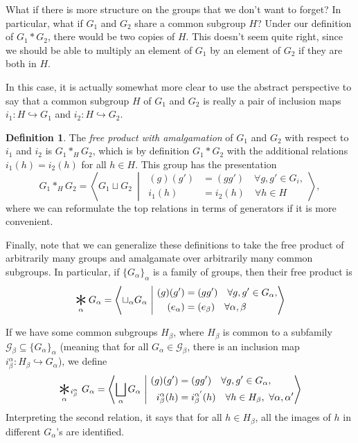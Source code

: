 \documentclass{article}
\theoremstyle{definition}
\newtheorem{defi}[thm]{Definition}
\theoremstyle{remark}
\numberwithin{figure}{section}
\DeclareMathOperator*{\bigast}{\vcenter{\hbox{\Huge$\ast$}}}
\begin{document}
What if there is more structure on the groups that we don't want to forget? In particular, what if $G_1$ and $G_2$ share a common subgroup $H$? Under our definition of $G_1 * G_2$, there would be two copies of $H$. This doesn't seem quite right, since we should be able to multiply an element of $G_1$ by an element of $G_2$ if they are both in $H$.

In this case, it is actually somewhat more clear to use the abstract perspective to say that a common subgroup $H$ of $G_1$ and $G_2$ is really a pair of inclusion maps $i_1 : H \hookrightarrow G_1$ and $i_2 : H \hookrightarrow G_2$.

\begin{defi}
	The \emph{free product with amalgamation} of $G_1$ and $G_2$ with respect to $i_1$ and $i_2$ is $G_1 *_H G_2$, which is by definition $G_1 * G_2$ with the additional relations $i_1(h) = i_2(h)$ for all $h \in H$. This group has the presentation
	\[
	G_1 *_H G_2 = \left\langle G_1 \sqcup G_2 \ \middle|\ \begin{aligned}(g)(g') &= (gg')\quad \forall g, g' \in G_i,\\i_1(h) &= i_2(h)\quad \forall h \in H\end{aligned} \right\rangle,
	\]
	where we can reformulate the top relations in terms of generators if it is more convenient.
\end{defi}

Finally, note that we can generalize these definitions to take the free product of arbitrarily many groups and amalgamate over arbitrarily many common subgroups. In particular, if $\{G_\alpha\}_\alpha$ is a family of groups, then their free product is
\[
\bigast_\alpha G_\alpha = \left\langle \sqcup_\alpha G_\alpha \ \middle|\ \begin{aligned}(g)(g') &= (gg')\quad \forall g, g' \in G_\alpha,\\(e_\alpha) &= (e_\beta)\quad \forall \alpha, \beta\end{aligned} \right\rangle
\]

If we have some common subgroups $H_\beta$, where $H_\beta$ is common to a subfamily $\mathcal{G}_\beta \subseteq \{G_\alpha\}_\alpha$ (meaning that for all $G_\alpha \in \mathcal{G}_\beta$, there is an inclusion map $i_\beta^\alpha : H_\beta \hookrightarrow G_\alpha$), we define
\[
\bigast_\alpha\!_{i_\beta^\alpha}\ G_\alpha = \left\langle \bigsqcup_\alpha G_\alpha \ \middle|\ \begin{aligned}(g)(g') &= (gg')\quad \forall g, g' \in G_\alpha,\\i_\beta^\alpha(h) &= i_\beta^{\alpha'}(h)\quad \forall h \in H_\beta,\ \forall \alpha,\alpha'\end{aligned} \right\rangle
\]
Interpreting the second relation, it says that for all $h \in H_\beta$, all the images of $h$ in different $G_\alpha$'s are identified.
\end{document}
